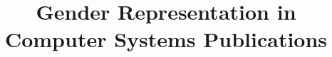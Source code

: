\documentclass{sig-alternate-05-2015}
\begin{document}






%

\title{Gender Representation in Computer Systems Publications }
%
%
%
%
%
\end{document}

